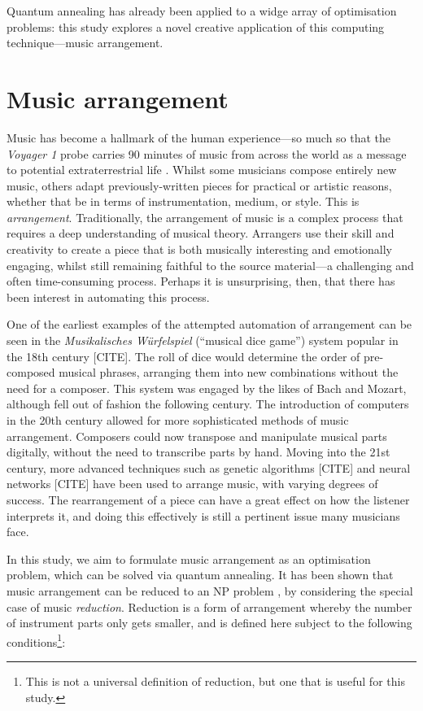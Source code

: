 \documentclass[12pt]{article}
\theoremstyle{definition}
\begin{document}
Quantum annealing has already been applied to a widge array of optimisation problems: this study explores a novel creative application of this computing technique---music arrangement.


\section{Music arrangement}
\label{sec:arrangement}

Music has become a hallmark of the human experience---so much so that the \textit{Voyager 1} probe carries 90 minutes of music from across the world as a message to potential extraterrestrial life \cite{nasa_golden_2024}. Whilst some musicians compose entirely new music, others adapt previously-written pieces for practical or artistic reasons, whether that be in terms of instrumentation, medium, or style. This is \emph{arrangement}.
Traditionally, the arrangement of music is a complex process that requires a deep understanding of musical theory. Arrangers use their skill and creativity to create a piece that is both musically interesting and emotionally engaging, whilst still remaining faithful to the source material---a challenging and often time-consuming process. Perhaps it is unsurprising, then, that there has been interest in automating this process.

One of the earliest examples of the attempted automation of arrangement can be seen in the \textit{Musikalisches Würfelspiel} (``musical dice game'') system popular in the 18th century [CITE]. The roll of dice would determine the order of pre-composed musical phrases, arranging them into new combinations without the need for a composer. This system was engaged by the likes of Bach and Mozart, although fell out of fashion the following century.
The introduction of computers in the 20th century allowed for more sophisticated methods of music arrangement. Composers could now transpose and manipulate musical parts digitally, without the need to transcribe parts by hand. Moving into the 21st century, more advanced techniques such as genetic algorithms [CITE] and neural networks [CITE] have been used to arrange music, with varying degrees of success. The rearrangement of a piece can have a great effect on how the listener interprets it, and doing this effectively is still a pertinent issue many musicians face. 

In this study, we aim to formulate music arrangement as an optimisation problem, which can be solved via quantum annealing. It has been shown that music arrangement can be reduced to an NP problem \cite{moses_computational_2016}, by considering the special case of music \emph{reduction}. Reduction is a form of arrangement whereby the number of instrument parts only gets smaller, and is defined here subject to the following conditions\footnote{This is not a universal definition of reduction, but one that is useful for this study.}:
\end{document}
